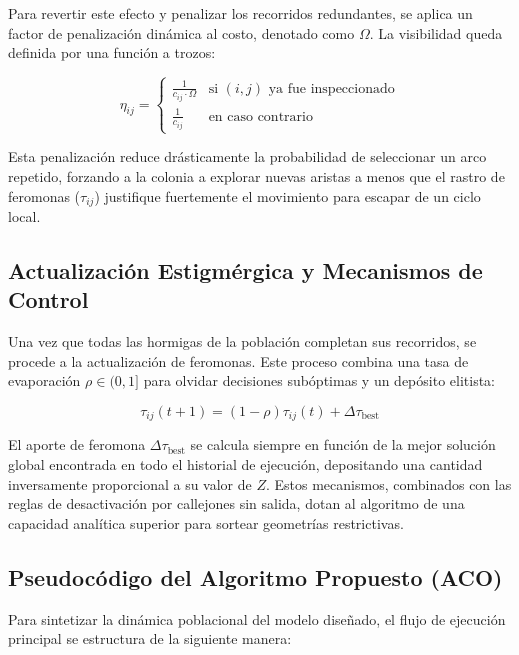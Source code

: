 \documentclass[conference]{IEEEtran}
\begin{document}
Para revertir este efecto y penalizar los recorridos redundantes, se aplica un factor de penalización dinámica al costo, denotado como $\Omega$. La visibilidad queda definida por una función a trozos:

\begin{equation}
\eta_{ij} = 
\begin{cases} 
\frac{1}{c_{ij} \cdot \Omega} & \text{si } (i,j) \text{ ya fue inspeccionado} \\
\frac{1}{c_{ij}} & \text{en caso contrario}
\end{cases}
\end{equation}

Esta penalización reduce drásticamente la probabilidad de seleccionar un arco repetido, forzando a la colonia a explorar nuevas aristas a menos que el rastro de feromonas ($\tau_{ij}$) justifique fuertemente el movimiento para escapar de un ciclo local.

\subsection{Actualización Estigmérgica y Mecanismos de Control}
Una vez que todas las hormigas de la población completan sus recorridos, se procede a la actualización de feromonas. Este proceso combina una tasa de evaporación $\rho \in (0,1]$ para olvidar decisiones subóptimas y un depósito elitista:

\begin{equation}
\tau_{ij}(t+1) = (1 - \rho)\tau_{ij}(t) + \Delta\tau_{\text{best}}
\end{equation}

El aporte de feromona $\Delta\tau_{\text{best}}$ se calcula siempre en función de la mejor solución global encontrada en todo el historial de ejecución, depositando una cantidad inversamente proporcional a su valor de $Z$. Estos mecanismos, combinados con las reglas de desactivación por callejones sin salida, dotan al algoritmo de una capacidad analítica superior para sortear geometrías restrictivas.

\subsection{Pseudocódigo del Algoritmo Propuesto (ACO)}
Para sintetizar la dinámica poblacional del modelo diseñado, el flujo de ejecución principal se estructura de la siguiente manera:
\end{document}
